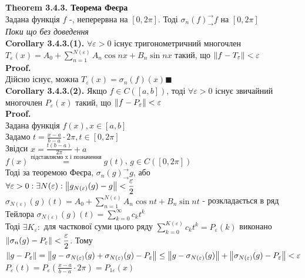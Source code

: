 \documentclass[a4paper, 10pt]{article}
\def\hugespace{\vspace{5mm} \\}
\theoremstyle{theoremdd}
\theoremstyle{theoremdd}
\theoremstyle{theoremdd}
\theoremstyle{theoremdd}
\theoremstyle{theoremdd}
\theoremstyle{theoremdd}
\theoremstyle{theoremdd}
\theoremstyle{theoremdd}
\begin{document}
\textbf{Theorem 3.4.3. Теорема Феєра}\\
Задана функція $f$ -, неперервна на $[0, 2\pi]$. Тоді $\sigma_n(f) ^\rightarrow_\rightarrow f$ на $[0,2\pi]$\\
\textit{Поки що без доведення}
\hugespace
\textbf{Corollary 3.4.3.(1).} $\forall \varepsilon>0$ існує тригонометричний многочлен $\displaystyle T_\varepsilon(x) = A_0 + \sum_{n=1}^{N(\varepsilon)} A_n \cos nx + B_n \sin nx$ такий, що $\norm{f - T_{\varepsilon}}<\varepsilon$\\
\textbf{Proof.}\\
Дійсно існує, можна $T_{\varepsilon}(x) = \sigma_n(f)(x) \blacksquare$
\hugespace
\textbf{Corollary 3.4.3.(2).} Якщо $f \in C([a,b])$, тоді $\forall \varepsilon>0$ існує звичайний многочлен $\displaystyle P_{\varepsilon}(x)$ такий, що $\norm{f-P_{\varepsilon}}<\varepsilon$\\
\textbf{Proof.}\\
Задана функція $f(x), x \in [a,b]$\\
Задамо $\displaystyle t = \frac{x-a}{b-a} \cdot 2\pi, t \in [0, 2\pi]$\\
Звідси $\displaystyle x = \frac{t(b-a)}{2\pi}+a$\\
$\displaystyle f(x) \overset{\textrm{підставляємо x і позначення}}{=} g(t)$, $g \in C([0,2\pi])$\\
Тоді за теоремою Феєра, $\sigma_n(g) ^\rightarrow_\rightarrow g$, або\\
$\displaystyle \forall \varepsilon > 0: \exists N(\varepsilon): \norm{g_{N(\varepsilon)}(g) -g} < \frac{\varepsilon}{2}$\\
$\displaystyle \sigma_{N(\varepsilon)}(g)(t) = A_0 + \sum_{n=1}^{N(\varepsilon)} A_n \cos nt + B_n \sin nt$ - розкладається в ряд Тейлора
$\displaystyle \sigma_{N(\varepsilon)}(g)(t) = \sum_{k=0}^{\infty} c_k t^k$\\
Тоді $\exists K_{\varepsilon}:$ для часткової суми цього ряду $\displaystyle \sum_{k=0}^{K(\varepsilon)} c_k t^k = P_{\varepsilon}(k)$ виконано $\displaystyle \norm{\sigma_n(g) - P_{\varepsilon}} < \frac{\varepsilon}{2}$. Тому\\
$\norm{g-P_{\varepsilon}} = \norm{g - \sigma_{N(\varepsilon)}(g) + \sigma_{N(\varepsilon)}(g) - P_{\varepsilon}} \leq \norm{g - \sigma_{N(\varepsilon)}(g)} + \norm{\sigma_{N(\varepsilon)}(g) - P_{\varepsilon}} < \varepsilon$\\
$\displaystyle P_{\varepsilon}(t) = P_{\varepsilon}(\frac{x-a}{b-a} \cdot 2\pi) = P_{1\varepsilon}(x)$\\
\end{document}
